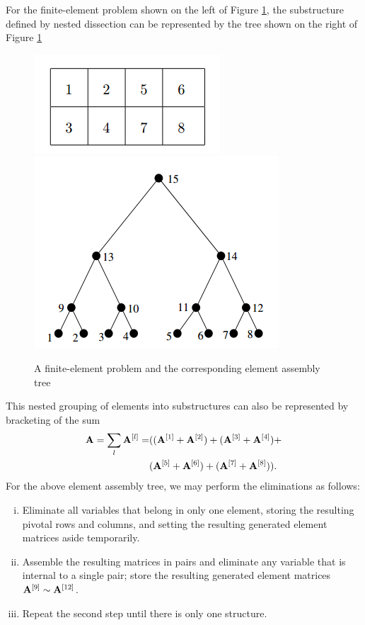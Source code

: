 \begin{exm}
    For the finite-element problem shown on the left of Figure 
    \ref{fig::FEMproblem}, the substructure defined by nested 
    dissection can be represented by the tree shown on the 
    right of Figure \ref{fig::FEMproblem}
    \begin{figure}[H]
        \includegraphics[width=0.45\linewidth]{png/FEMproblem.png}
        \includegraphics[width=0.45\linewidth]{png/assemblytree.png}
        \caption{A finite-element problem and the corresponding 
        element assembly tree}
        \label{fig::FEMproblem}
    \end{figure}
    This nested grouping of elements into substructures can 
    also be represented by bracketing of the sum
    \begin{align*}
        {\mathbf{A}}=\sum_{l}{\mathbf{A}}^{[l]}=&(({\mathbf{A}}^{[1]}+{\mathbf{A}}^{[2]})+
        ({\mathbf{A}}^{[3]}+{\mathbf{A}}^{[4]})+\\
        &({\mathbf{A}}^{[5]}+{\mathbf{A}}^{[6]})+({\mathbf{A}}^{[7]}+{\mathbf{A}}^{[8]})).
    \end{align*}
    For the above element assembly tree, we may perform the 
    eliminations as follows:
    \begin{enumerate}[(i)]
        \item Eliminate all variables that belong in only one 
                element, storing the resulting pivotal rows 
                and columns, and setting the resulting 
                generated element matrices aside temporarily.
        \item Assemble the resulting matrices in pairs and  
                eliminate any variable that is internal to a 
                single pair; store the resulting generated element matrices ${\mathbf{A}}^{[9]}\sim{\mathbf{A}}^{[12]}$.
        \item Repeat the second step until there is only one 
                structure.
    \end{enumerate}
\end{exm}

